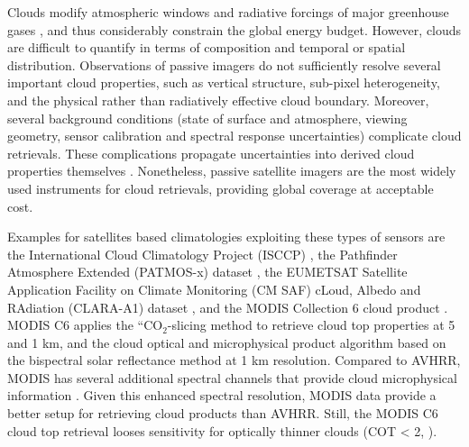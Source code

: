 Clouds modify atmospheric windows and radiative forcings of major greenhouse
gases \citep{Kiehl97}, and thus considerably constrain the global energy
budget. However, clouds are difficult to quantify in terms of composition and
temporal or spatial distribution. Observations of passive imagers do not
sufficiently resolve several important cloud properties, such as
vertical structure, sub-pixel heterogeneity, and the physical rather than radiatively
effective cloud boundary. Moreover, several background conditions (state of
surface and atmosphere, viewing geometry, sensor calibration and spectral
response uncertainties) complicate cloud retrievals. These
complications propagate uncertainties into derived cloud properties
themselves \citep{Hamann14}. Nonetheless, passive satellite imagers are the
most widely used instruments for cloud retrievals, providing global coverage at
acceptable cost. 

Examples for satellites based climatologies exploiting these types of sensors are the
International Cloud Climatology Project (ISCCP) \citep{Rossow99}, the
Pathfinder Atmosphere Extended (PATMOS-x) dataset
\citep{Heidinger09,Heidinger12}, the EUMETSAT Satellite Application
Facility on Climate Monitoring (CM SAF) cLoud, Albedo and RAdiation (CLARA-A1)
dataset \citep{Karlsson13}, and the MODIS Collection 6 cloud product \citep{Platnick17}.
MODIS C6 applies the ``CO$_{2}$-slicing method to retrieve cloud top properties at 5 and 1 km, and the cloud optical and microphysical product algorithm based on the bispectral solar reflectance method at 1 km resolution. Compared to AVHRR, MODIS has several additional spectral channels that provide cloud microphysical information \citep{Platnick17}. Given this enhanced spectral resolution, MODIS data provide a better setup for retrieving cloud products than AVHRR. Still, the MODIS C6 cloud top retrieval looses sensitivity for optically thinner clouds (COT < 2, \citet{Menzel10}).

